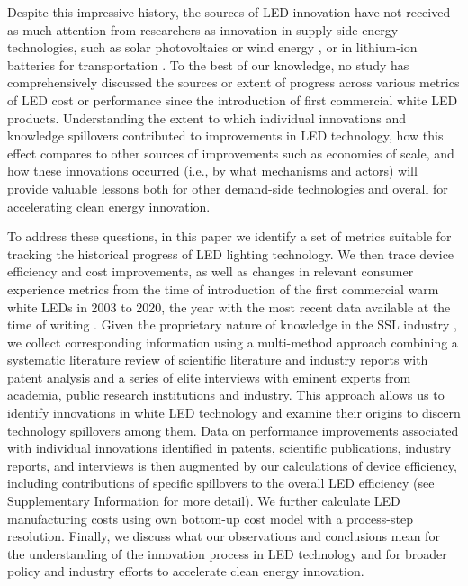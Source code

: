 \documentclass[twoside,twocolumn,9pt]{article}
\begin{document}
Despite this impressive history, the sources of LED innovation have not received as much attention from researchers as innovation in supply-side  energy technologies, such as solar photovoltaics  \cite{kavlak2018evaluating} or wind energy \cite{qiu2012price}\cite{jennings2020policy}, or in lithium-ion batteries for transportation \cite{Ziegler2021}\cite{Stephan2021}. To the best of our knowledge, no study has comprehensively discussed the sources or extent of progress across various metrics of LED cost or performance since the introduction of first commercial white LED products.  Understanding the extent to which individual innovations and knowledge spillovers  contributed to improvements in LED technology, how this effect compares to other sources of improvements such as economies of scale, and how these innovations occurred (i.e., by what mechanisms and actors) will provide valuable lessons both for other demand-side technologies and overall for accelerating clean energy innovation.

To address these questions, in this paper we identify a set of metrics suitable for tracking the historical progress of LED lighting technology. We then trace device efficiency and cost improvements, as well as changes in relevant consumer experience metrics from the time of introduction of the first commercial warm white LEDs in 2003 to 2020, the year with the most recent data available at the time of writing  . Given the proprietary nature of knowledge in the SSL industry , we collect corresponding information using a multi-method approach combining a systematic literature review of scientific literature and industry reports with patent analysis and a series of elite interviews \cite{Tansey} with eminent experts from academia, public research institutions and industry. This approach allows us to identify innovations in white LED technology and examine their origins to discern technology spillovers among them. Data on performance improvements associated with individual innovations identified in patents, scientific publications, industry reports, and interviews is then augmented  by our calculations of device efficiency, including contributions of specific spillovers to the overall LED efficiency (see Supplementary Information for more detail). We further calculate LED manufacturing costs using own bottom-up cost model with a process-step resolution. Finally, we discuss what our observations and conclusions mean for the understanding of the innovation process in LED technology and for broader policy and industry efforts to accelerate clean energy innovation.
\end{document}
